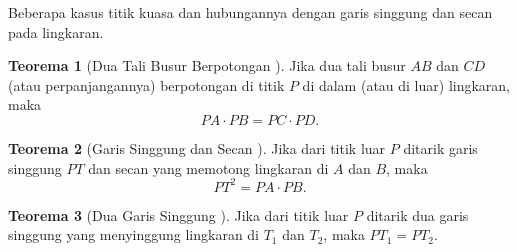 \documentclass[aspectratio=169]{beamer}
\theoremstyle{definition}
\newtheorem{teorema}{Teorema}
\begin{document}
\begin{frame}{\insertsection}{\insertsubsection}
\begin{center}
  \end{center}
  \vspace*{-2cm}
  Beberapa kasus titik kuasa dan hubungannya dengan garis singgung dan secan pada lingkaran.
\end{frame}

\begin{frame}{\insertsection}{\insertsubsection}
  \begin{teorema}[Dua Tali Busur Berpotongan \label{thm:power_of_point}]
    Jika dua tali busur $AB$ dan $CD$ (atau perpanjangannya) berpotongan di titik $P$ di dalam (atau di luar) lingkaran, maka
    \[
      PA \cdot PB = PC \cdot PD.
    \]
  \end{teorema}

  \begin{teorema}[Garis Singgung dan Secan \label{thm:tangent_secant}]
    Jika dari titik luar $P$ ditarik garis singgung $PT$ dan secan yang memotong lingkaran di $A$ dan $B$, maka
    \[
      PT^2 = PA \cdot PB.
    \]
  \end{teorema}

  \begin{teorema}[Dua Garis Singgung \label{thm:tangent_tangent}]
    Jika dari titik luar $P$ ditarik dua garis singgung yang menyinggung lingkaran di $T_1$ dan $T_2$, maka
    $
      PT_1 = PT_2.
    $
  \end{teorema}
\end{frame}
\end{document}
